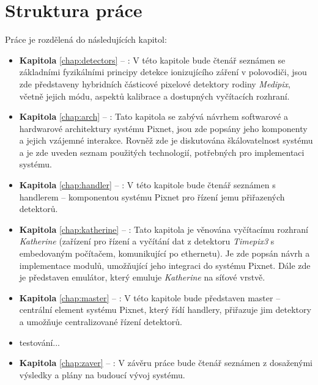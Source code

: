 \section{Struktura práce}
Práce je rozdělená do následujících kapitol:
\begin{itemize}
    
    \item \textbf{Kapitola} \ref{chap:detectors} -- : V této kapitole bude čtenář seznámen se základními fyzikálními principy detekce ionizujícího záření v polovodiči, jsou zde představeny hybridních částicové pixelové detektory rodiny \textit{Medipix}, včetně jejich módu, aspektů kalibrace a dostupných vyčítacích rozhraní.
    
    \item \textbf{Kapitola} \ref{chap:arch} -- : Tato kapitola se zabývá návrhem softwarové a hardwarové architektury systému Pixnet, jsou zde popsány jeho komponenty a jejich vzájemné interakce. Rovněž zde je diskutována škálovatelnost systému a je zde uveden seznam použitých technologií, potřebných pro implementaci systému.
    
    \item \textbf{Kapitola} \ref{chap:handler} -- : V této kapitole bude čtenář seznámen s handlerem -- komponentou systému Pixnet pro řízení jemu přiřazených detektorů.
    
    \item \textbf{Kapitola} \ref{chap:katherine} -- : Tato kapitola je věnována vyčítacímu rozhraní \textit{Katherine} (zařízení pro řízení a vyčítání dat z detektoru \textit{Timepix3} s embedovaným počítačem, komunikující po ethernetu). Je zde popsán návrh a implementace modulů, umožňující jeho integraci do systému Pixnet. Dále zde je představen emulátor, který emuluje \textit{Katherine} na síťové vrstvě.
    
    \item \textbf{Kapitola} \ref{chap:master} -- : V této kapitole bude představen master -- centrální element systému Pixnet, který řídí handlery, přiřazuje jim detektory a umožňuje centralizované řízení detektorů.
    
    \item \todo testování...
    
    \item \textbf{Kapitola} \ref{chap:zaver} -- : V závěru práce bude čtenář seznámen z dosaženými výsledky a plány na budoucí vývoj systému.

\end{itemize}